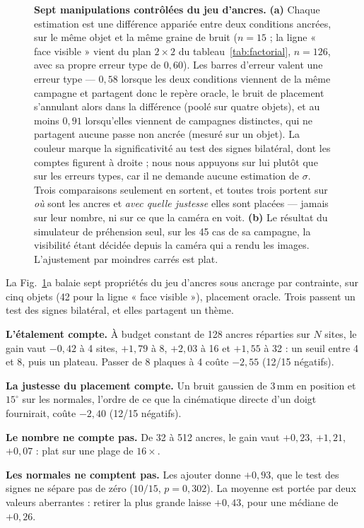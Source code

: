 \documentclass[conference]{IEEEtran}
\begin{document}
\begin{figure}[t]
\centering
\resizebox{\textwidth}{!}{}
\caption{\textbf{Sept manipulations contrôlées du jeu d'ancres.}
\textbf{(a)} Chaque estimation est une différence appariée entre deux conditions
ancrées, sur le même objet et la même graine de bruit ($n=15$ ; la ligne « face
visible » vient du plan $2\times2$ du tableau~\ref{tab:factorial}, $n=126$, avec sa
propre erreur type de $0{,}60$). Les barres d'erreur
valent une erreur type --- $0{,}58$ lorsque les deux conditions viennent de la même
campagne et partagent donc le repère oracle, le bruit de placement s'annulant alors
dans la différence (poolé sur quatre objets), et au moins $0{,}91$ lorsqu'elles viennent
de campagnes distinctes, qui ne partagent aucune passe non ancrée (mesuré sur un objet). La couleur marque la significativité au test des
signes bilatéral, dont les comptes figurent à droite ; nous nous appuyons sur lui
plutôt que sur les erreurs types, car il ne demande aucune estimation de $\sigma$.
Trois comparaisons seulement en sortent, et toutes trois portent sur \emph{où} sont les
ancres et \emph{avec quelle justesse} elles sont placées --- jamais sur leur nombre, ni
sur ce que la caméra en voit. \textbf{(b)} Le résultat du simulateur de préhension
seul, sur les 45 cas de sa campagne, la visibilité étant décidée depuis la
caméra qui a rendu les images. L'ajustement par moindres carrés est plat.}
\label{fig:results}
\end{figure}

La Fig.~\ref{fig:results}a balaie sept propriétés du jeu d'ancres sous ancrage par
contrainte, sur cinq objets (42 pour la ligne « face visible »), placement oracle.
Trois passent un test des signes bilatéral, et elles partagent un thème.

\textbf{L'étalement compte.} À budget constant de 128 ancres réparties sur $N$ sites,
le gain vaut $-0{,}42$ à 4 sites, $+1{,}79$ à 8, $+2{,}03$ à 16 et $+1{,}55$ à 32 : un
seuil entre 4 et 8, puis un plateau. Passer de 8 plaques à 4 coûte $-2{,}55$ (12/15
négatifs).

\textbf{La justesse du placement compte.} Un bruit gaussien de $3$\,mm en position et
$15^\circ$ sur les normales, l'ordre de ce que la cinématique directe d'un doigt
fournirait, coûte $-2{,}40$ (12/15 négatifs).

\textbf{Le nombre ne compte pas.} De 32 à 512 ancres, le gain vaut $+0{,}23$,
$+1{,}21$, $+0{,}07$ : plat sur une plage de $16\times$.

\textbf{Les normales ne comptent pas.} Les ajouter donne $+0{,}93$, que le test des
signes ne sépare pas de zéro ($10/15$, $p = 0{,}302$). La moyenne est portée par deux
valeurs aberrantes : retirer la plus grande laisse $+0{,}43$, pour une médiane de
$+0{,}26$.
\end{document}
